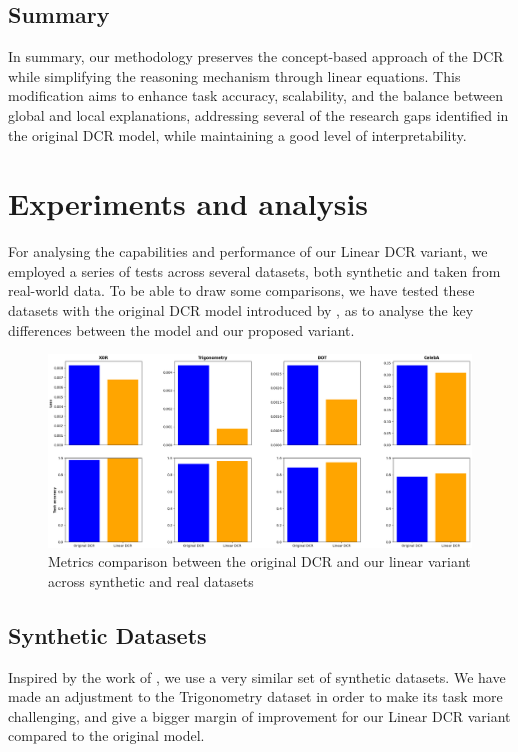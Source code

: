 \documentclass[sigconf, nonacm]{acmart}
\begin{document}
\subsection{Summary}
\vspace{2pt}
In summary, our methodology preserves the concept-based approach of the DCR while simplifying the reasoning mechanism through linear equations. This modification aims to enhance task accuracy, scalability, and the balance between global and local explanations, addressing several of the research gaps identified in the original DCR model, while maintaining a good level of interpretability. \vspace{8pt}

\section{Experiments and analysis}
\vspace{2pt}
For analysing the capabilities and performance of our Linear DCR variant, we employed a series of tests across several datasets, both synthetic and taken from real-world data. To be able to draw some comparisons, we have tested these datasets with the original DCR model introduced by \citet{barbiero2023interpretable}, as to analyse the key differences between the model and our proposed variant. \vspace{6pt}

\begin{figure}[ht]
\centering
\includegraphics[width=1\linewidth]{./DCR_comparisons.png}
\caption{Metrics comparison between the original DCR and our linear variant across synthetic and real datasets}
\label{fig:figure1}
\end{figure}

\subsection{Synthetic Datasets}
\vspace{2pt}
Inspired by the work of \citet{barbiero2023interpretable}, we use a very similar set of synthetic datasets. We have made an adjustment to the Trigonometry dataset in order to make its task more challenging, and give a bigger margin of improvement for our Linear DCR variant compared to the original model. \vspace{8pt}
\end{document}
